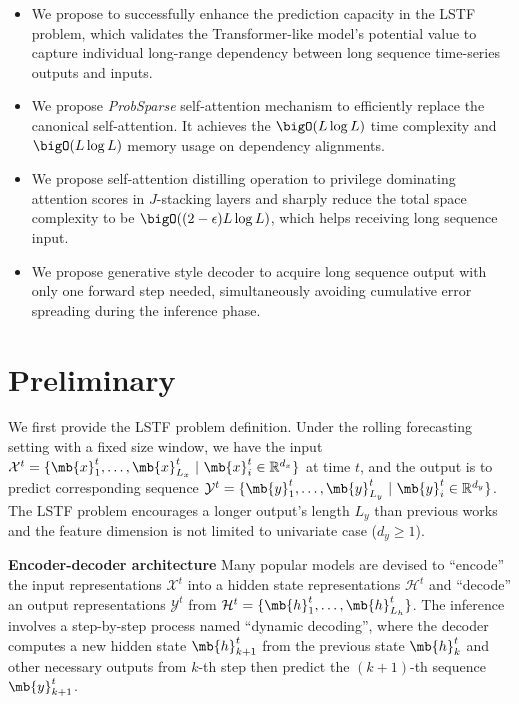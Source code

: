 \begin{itemize}[nosep, leftmargin=0.45cm]
\item We propose {\mn} to successfully enhance the prediction capacity in the LSTF problem, which validates the Transformer-like model's potential value to capture individual long-range dependency between long sequence time-series outputs and inputs.
\item We propose \emph{ProbSparse} self-attention mechanism to efficiently replace the canonical self-attention. It achieves the $\bigO(L \log L)$ time complexity and $\bigO(L \log L)$ memory usage on dependency alignments.
\item We propose self-attention distilling operation to privilege dominating attention scores in $J$-stacking layers and sharply reduce the total space complexity to be $\bigO((2-\epsilon)L \log L)$, which helps receiving long sequence input.
\item We propose generative style decoder to acquire long sequence output with only one forward step needed, simultaneously avoiding cumulative error spreading during the inference phase.
\end{itemize}

\section{Preliminary}
\label{sec:method}

We first provide the LSTF problem definition.
Under the rolling forecasting setting with a fixed size window, we have the input $\mathcal{X}^t=\{\mb{x}^t_1,\ldots,\mb{x}^t_{L_x} ~|~ \mb{x}^t_{i} \in \mathbb{R}^{d_{x}}\}$ at time $t$, and the output is to predict corresponding sequence $\mathcal{Y}^t=\{\mb{y}^t_1,\ldots,\mb{y}^t_{L_y} ~|~ \mb{y}^t_{i} \in \mathbb{R}^{d_{y}} \}$. The LSTF problem encourages a longer output's length $L_y$ than previous works \cite{cho2014properties,sutskever2014sequence} and the feature dimension is not limited to univariate case ($d_{y} \geq 1$).

\textbf{Encoder-decoder architecture}
Many popular models are devised to ``encode'' the input representations $\mathcal{X}^t$ into a hidden state representations $\mathcal{H}^t$ and ``decode'' an output representations $\mathcal{Y}^t$ from $\mathcal{H}^t=\{\mb{h}^t_1,\ldots,\mb{h}^t_{L_h}\}$. The inference involves a step-by-step process named ``dynamic decoding'', where the decoder computes a new hidden state $\mb{h}^t_{k+1}$ from the previous state $\mb{h}^t_{k}$ and other necessary outputs from $k$-th step then predict the $(k+1)$-th sequence $\mb{y}^t_{k+1}$.

